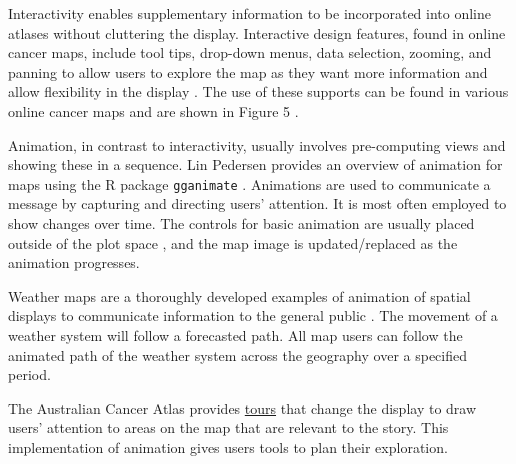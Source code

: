\documentclass{monashthesis}
\begin{document}
Interactivity enables supplementary information to be incorporated into online atlases without cluttering the display. Interactive design features, found in online cancer maps, include tool tips, drop-down menus, data selection, zooming, and panning to allow users to explore the map as they want more information and allow flexibility in the display \autocite{HTLWM}. The use of these supports can be found in various online cancer maps and are shown in Figure 5 \autocite{roberts2019communication}.

Animation, in contrast to interactivity, usually involves pre-computing views and showing these in a sequence. Lin Pedersen \autocite{TGA} provides an overview of animation for maps using the R package \texttt{gganimate} \autocite{gganimate}. Animations are used to communicate a message by capturing and directing users' attention. It is most often employed to show changes over time. The controls for basic animation are usually placed outside of the plot space \autocite{TGA}, and the map image is updated/replaced as the animation progresses.

Weather maps are a thoroughly developed examples of animation of spatial displays to communicate information to the general public \autocite{CPISACA}. The movement of a weather system will follow a forecasted path. All map users can follow the animated path of the weather system across the geography over a specified period.

The Australian Cancer Atlas \autocite{TACA} provides \href{https://atlas.cancer.org.au/app/tour/lungcancer}{tours} that change the display to draw users' attention to areas on the map that are relevant to the story.
This implementation of animation gives users tools to plan their exploration.
\end{document}
